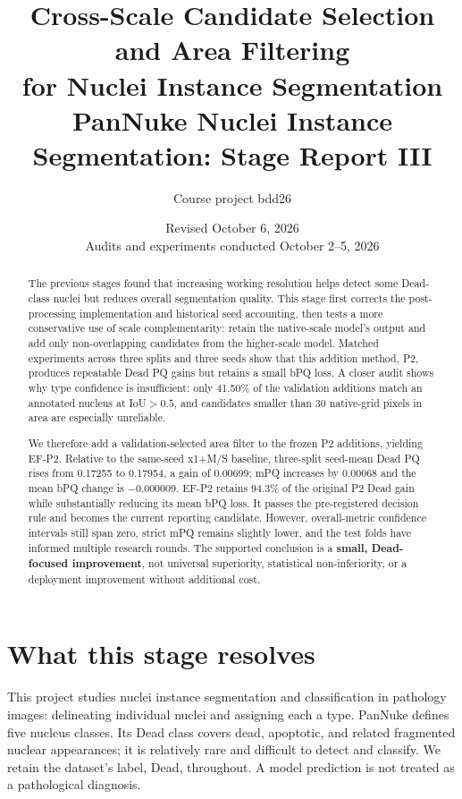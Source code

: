\documentclass[11pt,a4paper]{article}
\title{\bfseries Cross-Scale Candidate Selection and Area Filtering\\for Nuclei Instance Segmentation\\[7pt]
\large PanNuke Nuclei Instance Segmentation: Stage Report III}
\author{Course project bdd26}
\date{Revised October 6, 2026\\\small Audits and experiments conducted October 2--5, 2026}
\begin{document}
\maketitle

\begin{abstract}
The previous stages found that increasing working resolution helps detect some Dead-class nuclei but reduces overall segmentation quality. This stage first corrects the post-processing implementation and historical seed accounting, then tests a more conservative use of scale complementarity: retain the native-scale model's output and add only non-overlapping candidates from the higher-scale model. Matched experiments across three splits and three seeds show that this addition method, P2, produces repeatable Dead PQ gains but retains a small bPQ loss. A closer audit shows why type confidence is insufficient: only 41.50\% of the validation additions match an annotated nucleus at IoU$>0.5$, and candidates smaller than 30 native-grid pixels in area are especially unreliable.

We therefore add a validation-selected area filter to the frozen P2 additions, yielding EF-P2. Relative to the same-seed x1+M/S baseline, three-split seed-mean Dead PQ rises from 0.17255 to 0.17954, a gain of 0.00699; mPQ increases by 0.00068 and the mean bPQ change is $-0.000009$. EF-P2 retains 94.3\% of the original P2 Dead gain while substantially reducing its mean bPQ loss. It passes the pre-registered decision rule and becomes the current reporting candidate. However, overall-metric confidence intervals still span zero, strict mPQ remains slightly lower, and the test folds have informed multiple research rounds. The supported conclusion is a \textbf{small, Dead-focused improvement}, not universal superiority, statistical non-inferiority, or a deployment improvement without additional cost.
\end{abstract}

\section{What this stage resolves}

This project studies nuclei instance segmentation and classification in pathology images: delineating individual nuclei and assigning each a type. PanNuke defines five nucleus classes\cite{pannuke}. Its Dead class covers dead, apoptotic, and related fragmented nuclear appearances; it is relatively rare and difficult to detect and classify. We retain the dataset's label, Dead, throughout. A model prediction is not treated as a pathological diagnosis.
\end{document}
